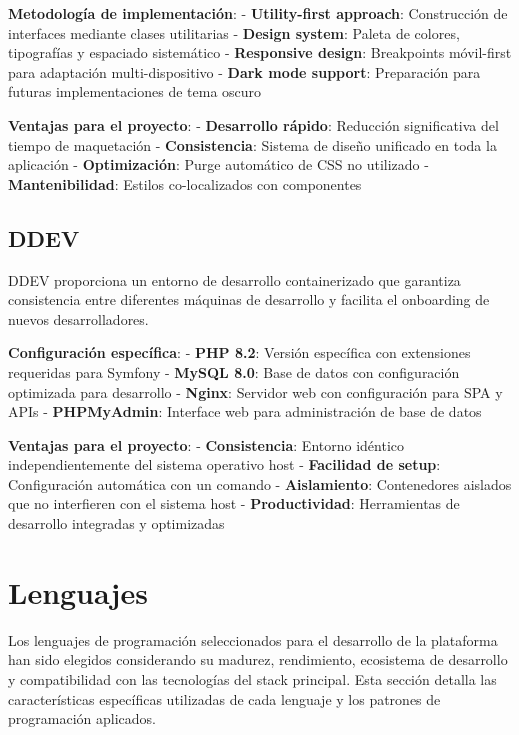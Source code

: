 \documentclass[12pt,a4paper,oneside]{report}
\begin{document}
\textbf{Metodología de implementación}: - \textbf{Utility-first
approach}: Construcción de interfaces mediante clases utilitarias -
\textbf{Design system}: Paleta de colores, tipografías y espaciado
sistemático - \textbf{Responsive design}: Breakpoints móvil-first para
adaptación multi-dispositivo - \textbf{Dark mode support}: Preparación
para futuras implementaciones de tema oscuro

\textbf{Ventajas para el proyecto}: - \textbf{Desarrollo rápido}:
Reducción significativa del tiempo de maquetación -
\textbf{Consistencia}: Sistema de diseño unificado en toda la aplicación
- \textbf{Optimización}: Purge automático de CSS no utilizado -
\textbf{Mantenibilidad}: Estilos co-localizados con componentes

\subsection{DDEV}\label{ddev}

DDEV proporciona un entorno de desarrollo containerizado que garantiza
consistencia entre diferentes máquinas de desarrollo y facilita el
onboarding de nuevos desarrolladores.

\textbf{Configuración específica}: - \textbf{PHP 8.2}: Versión
específica con extensiones requeridas para Symfony - \textbf{MySQL 8.0}:
Base de datos con configuración optimizada para desarrollo -
\textbf{Nginx}: Servidor web con configuración para SPA y APIs -
\textbf{PHPMyAdmin}: Interface web para administración de base de datos

\textbf{Ventajas para el proyecto}: - \textbf{Consistencia}: Entorno
idéntico independientemente del sistema operativo host -
\textbf{Facilidad de setup}: Configuración automática con un comando -
\textbf{Aislamiento}: Contenedores aislados que no interfieren con el
sistema host - \textbf{Productividad}: Herramientas de desarrollo
integradas y optimizadas

\section{Lenguajes}\label{lenguajes}

Los lenguajes de programación seleccionados para el desarrollo de la
plataforma han sido elegidos considerando su madurez, rendimiento,
ecosistema de desarrollo y compatibilidad con las tecnologías del stack
principal. Esta sección detalla las características específicas
utilizadas de cada lenguaje y los patrones de programación aplicados.
\end{document}
